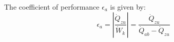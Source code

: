 The coefficient of performance \( \epsilon_a \) is given by:  
\[
\epsilon_a = \left| \frac{\dot{Q}_{zu}}{\dot{W}_k} \right| = \frac{\dot{Q}_{zu}}{\dot{Q}_{ab} - \dot{Q}_{zu}}
\]